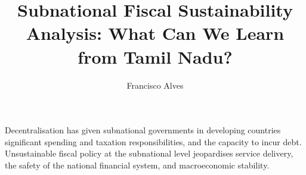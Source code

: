 \documentclass[12pt]{article}
\author{Francisco Alves}
\title{Subnational Fiscal Sustainability Analysis: What Can We Learn from Tamil Nadu?}
\begin{document}
\maketitle


Decentralisation has given subnational governments in developing countries significant spending and taxation responsibilities, and the capacity to incur debt. Unsustainable fiscal policy at the subnational level jeopardises service delivery, the safety of the national financial system, and macroeconomic stability. \citep{ianchovichina2007}




{\footnotesize
}
\end{document}
